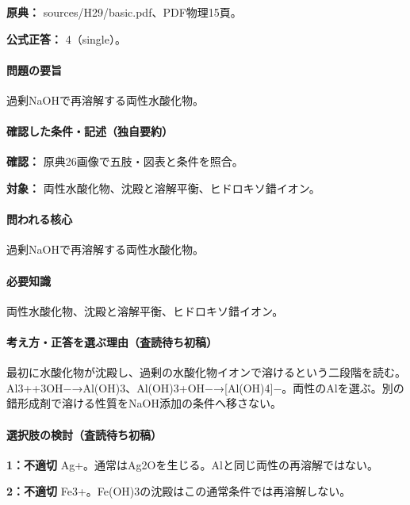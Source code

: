 \noindent\textbf{原典：} sources/H29/basic.pdf、PDF物理15頁。

\textbf{公式正答：} 4（single）。

\paragraph{問題の要旨} 過剰NaOHで再溶解する両性水酸化物。

\paragraph{確認した条件・記述（独自要約）}\mbox{}\par

\noindent\textbf{確認：} 原典26画像で五肢・図表と条件を照合。\par

\noindent\textbf{対象：} 両性水酸化物、沈殿と溶解平衡、ヒドロキソ錯イオン。\par

\paragraph{問われる核心} 過剰NaOHで再溶解する両性水酸化物。

\paragraph{必要知識} 両性水酸化物、沈殿と溶解平衡、ヒドロキソ錯イオン。

\paragraph{考え方・正答を選ぶ理由（査読待ち初稿）} 最初に水酸化物が沈殿し、過剰の水酸化物イオンで溶けるという二段階を読む。Al3++3OH−→Al(OH)3、Al(OH)3+OH−→[Al(OH)4]−。両性のAlを選ぶ。別の錯形成剤で溶ける性質をNaOH添加の条件へ移さない。

\paragraph{選択肢の検討（査読待ち初稿）}\mbox{}\par

\noindent\textbf{1：不適切} Ag+。通常はAg2Oを生じる。Alと同じ両性の再溶解ではない。\par

\noindent\textbf{2：不適切} Fe3+。Fe(OH)3の沈殿はこの通常条件では再溶解しない。\par

